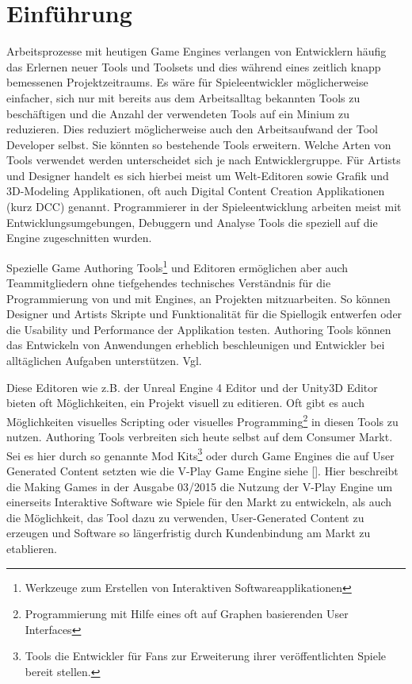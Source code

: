 \documentclass[pagesize, paper=a4, fontsize=12pt, titlepage=true, headings=small, headnosepline, abstractoff, liststotoc, nochapterprefix, plainheadsepline, twoside]{scrreprt}
\begin{document}
\chapter{Einführung}
Arbeitsprozesse mit heutigen Game Engines verlangen von Entwicklern häufig das Erlernen neuer Tools und Toolsets und dies während eines zeitlich knapp bemessenen Projektzeitraums. Es wäre für Spieleentwickler möglicherweise einfacher, sich nur mit bereits aus dem Arbeitsalltag bekannten Tools zu beschäftigen und die Anzahl der verwendeten Tools auf ein Minium zu reduzieren. Dies reduziert möglicherweise auch den Arbeitsaufwand der Tool Developer selbst. Sie könnten so bestehende Tools erweitern. Welche Arten von Tools verwendet werden unterscheidet sich je nach Entwicklergruppe. Für Artists und Designer handelt es sich hierbei meist um Welt-Editoren sowie Grafik und 3D-Modeling Applikationen, oft auch Digital Content Creation Applikationen (kurz DCC) genannt. Programmierer in der Spieleentwicklung arbeiten meist mit Entwicklungsumgebungen, Debuggern und Analyse Tools die speziell auf die Engine zugeschnitten wurden.

Spezielle Game Authoring Tools\footnote{Werkzeuge zum Erstellen von Interaktiven Softwareapplikationen} und Editoren ermöglichen aber auch Teammitgliedern ohne tiefgehendes technisches Verständnis für die Programmierung von und mit Engines, an Projekten mitzuarbeiten. So können Designer und Artists Skripte und Funktionalität für die Spiellogik entwerfen oder die Usability und Performance der Applikation testen. Authoring Tools können das Entwickeln von Anwendungen erheblich beschleunigen und Entwickler bei alltäglichen Aufgaben unterstützen. Vgl. 

Diese Editoren wie z.B. der Unreal Engine 4 Editor und der Unity3D Editor bieten oft Möglichkeiten, ein Projekt visuell zu editieren. Oft gibt es auch Möglichkeiten visuelles Scripting oder visuelles Programming\footnote{Programmierung mit Hilfe eines oft auf Graphen basierenden User Interfaces} in diesen Tools zu nutzen. Authoring Tools verbreiten sich heute selbst auf dem Consumer Markt. Sei es hier durch so genannte Mod Kits\footnote{Tools die Entwickler für Fans zur Erweiterung ihrer veröffentlichten Spiele bereit stellen.} oder durch Game Engines die auf User Generated Content setzten wie die V-Play Game Engine siehe []. Hier beschreibt die Making Games in der Ausgabe 03/2015 die Nutzung der V-Play Engine um einerseits Interaktive Software wie Spiele für den Markt zu entwickeln, als auch die Möglichkeit, das Tool dazu zu verwenden, User-Generated Content zu erzeugen und Software so längerfristig durch Kundenbindung am Markt zu etablieren.
\end{document}
